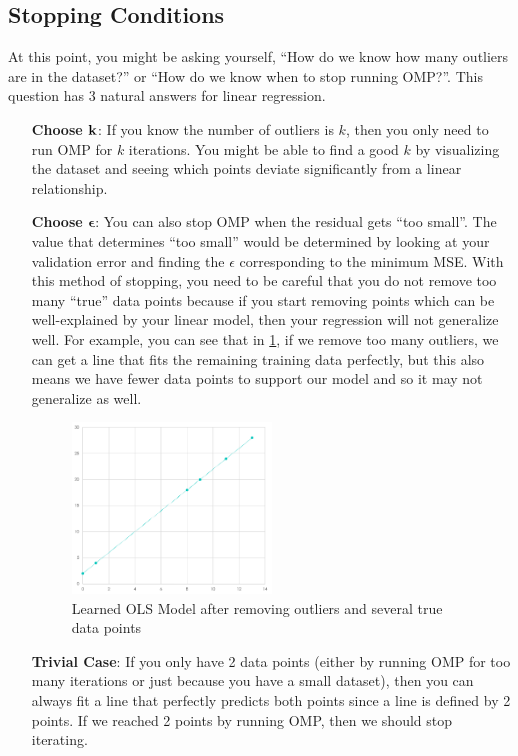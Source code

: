   \subsection{Stopping Conditions}
  At this point, you might be asking yourself, ``How do we know how many outliers are in the dataset?'' or ``How do we know when to stop running OMP?''.
  This question has 3 natural answers for linear regression.
  \begin{enumerate}
	\item[\textbf{Choose $\mathbf{k}$}:] If you know the number of outliers is $k$, then you only need to run OMP for $k$ iterations. 
	  You might be able to find a good $k$ by visualizing the dataset and seeing which points deviate significantly from a linear relationship.
	\item[\textbf{Choose $\boldsymbol{\epsilon}$}:] You can also stop OMP when the residual gets ``too small''. The value that determines ``too small'' would be determined by looking at your validation error and finding the $\epsilon$ corresponding to the minimum MSE.
	  With this method of stopping, you need to be careful that you do not remove too many ``true'' data points because if you start removing points which can be well-explained by your linear model, then your regression will not generalize well.
	  For example, you can see that in \cref{fig:stopping}, if we remove too many outliers, we can get a line that fits the remaining training data perfectly, but this also means we have fewer data points to support our model and so it may not generalize as well.
	  \begin{figure}[!h]
		\centering
		\includegraphics[width=0.5\textwidth]{Images/stopping}
		\caption{Learned OLS Model after removing outliers and several true data points}
		\label{fig:stopping}
	  \end{figure}
	\item[\textbf{Trivial Case}:] If you only have 2 data points (either by running OMP for too many iterations or just because you have a small dataset), then you can always fit a line that perfectly predicts both points since a line is defined by 2 points. If we reached 2 points by running OMP, then we should stop iterating.
  \end{enumerate}

